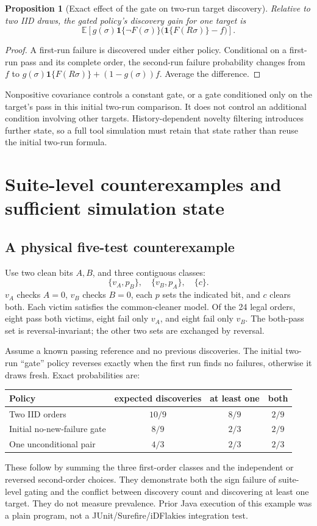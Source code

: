 \documentclass[11pt,a4paper]{article}
\newtheorem{proposition}[theorem]{Proposition}
\theoremstyle{definition}\newtheorem{definition}[theorem]{Definition}
\theoremstyle{remark}\newtheorem{remark}[theorem]{Remark}
\newcommand{\E}{\mathbb E}
\newcommand{\ind}{\mathbf 1}
\theoremstyle{definition}\newtheorem{xexample}[xtheorem]{Example}\theoremstyle{plain}
\providecommand{\ind}{\mathbf 1}
\begin{document}
\begin{proposition}[Exact effect of the gate on two-run target discovery]
Relative to two IID draws, the gated policy's discovery gain for one target is
\begin{equation}\label{eq:gatedgain}
 \E\left[g(\sigma)\ind\{\neg F(\sigma)\}
          \bigl(\ind\{F(R\sigma)\}-f\bigr)\right].
\end{equation}
\end{proposition}
\begin{proof}
A first-run failure is discovered under either policy. Conditional on a first-run pass and its complete order, the second-run failure probability changes from $f$ to $g(\sigma)\ind\{F(R\sigma)\}+(1-g(\sigma))f$. Average the difference.
\end{proof}
Nonpositive covariance controls a constant gate, or a gate conditioned only on the target's pass in this initial two-run comparison. It does not control an additional condition involving other targets. History-dependent novelty filtering introduces further state, so a full tool simulation must retain that state rather than reuse the initial two-run formula.

\section{Suite-level counterexamples and sufficient simulation state}\label{sec:suite}
\subsection{A physical five-test counterexample}
Use two clean bits $A,B$, and three contiguous classes:
\[
 \{v_A,p_B\},\quad\{v_B,p_A\},\quad\{c\}.
\]
$v_A$ checks $A=0$, $v_B$ checks $B=0$, each $p$ sets the indicated bit, and $c$ clears both. Each victim satisfies the common-cleaner model. Of the 24 legal orders, eight pass both victims, eight fail only $v_A$, and eight fail only $v_B$. The both-pass set is reversal-invariant; the other two sets are exchanged by reversal.

Assume a known passing reference and no previous discoveries. The initial two-run ``gate'' policy reverses exactly when the first run finds no failures, otherwise it draws fresh. Exact probabilities are:
\begin{center}
\begin{tabular}{lccc}
\toprule
Policy & expected discoveries & at least one & both\\\midrule
Two IID orders & $10/9$ & $8/9$ & $2/9$\\
Initial no-new-failure gate & $8/9$ & $2/3$ & $2/9$\\
One unconditional pair & $4/3$ & $2/3$ & $2/3$\\\bottomrule
\end{tabular}
\end{center}
These follow by summing the three first-order classes and the independent or reversed second-order choices. They demonstrate both the sign failure of suite-level gating and the conflict between discovery count and discovering at least one target. They do not measure prevalence. Prior Java execution of this example was a plain program, not a JUnit/Surefire/iDFlakies integration test.
\end{document}
